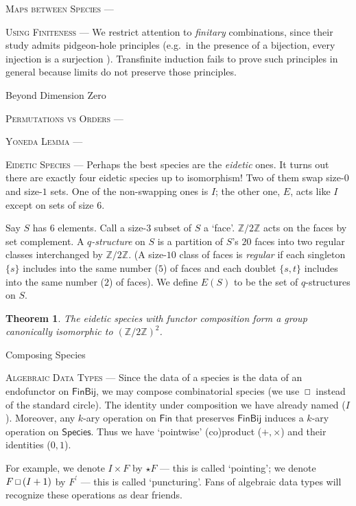 \documentclass[12pt, justified]{tufte-book}
\newcommand{\ZZ}{\mathbb{Z}}
\newcommand{\smallsquare}{\,\text{\scriptsize$\square$}\,}
\newtheorem*{thm}{Theorem}
\theoremstyle{definition}
\newcommand{\mssec}[1]{
  \begin{center}\parbox{8cm}{\begin{center}
    \large\sc#1
  \end{center}}\end{center}
      \vspace{-0.5cm}
}
\newcommand{\mpar}[1]{\vspace{0.5cm}\par\noindent\textsc{#1} --- }
\begin{document}
      \mpar{Maps between Species}

      \mpar{Using Finiteness}
        We restrict attention to \emph{finitary} combinations, since their
        study admits pidgeon-hole principles (e.g.\ in the presence of a
        bijection, every injection is a surjection%
        ).  Transfinite induction fails to prove such principles in general
        because limits do not preserve those principles.

    \mssec{Beyond Dimension Zero}
      \mpar{Permutations vs Orders}
      \mpar{Yoneda Lemma}
      \mpar{Eidetic Species}%
        Perhaps the best species are the \emph{eidetic} ones.
        It turns out there are exactly four
        eidetic species up to isomorphism!  
        Two of them swap size-$0$ and size-$1$ sets.
        One of the non-swapping ones is $I$;
        the other one, $E$, acts like $I$ except on sets of size $6$.

        Say $S$ has $6$ elements.  Call a size-$3$ subset of $S$ a `face'.
        $\ZZ/2\ZZ$ acts on the faces by set complement.
        A \emph{$q$-structure} on $S$ is a partition of $S$'s $20$ faces into
        two regular classes interchanged by $\ZZ/2\ZZ$.
        (A size-$10$ class of faces is \emph{regular} if each singleton $\{s\}$
        includes into the same number ($5$) of faces and each doublet $\{s,
        t\}$ includes into the same number ($2$) of faces).  We define $E(S)$
        to be the set of $q$-structures on $S$.

        \begin{thm}
          The eidetic species with functor composition form a group canonically
            isomorphic to $(\ZZ/2\ZZ)^2$.
        \end{thm}

    \mssec{Composing Species}
      \mpar{Algebraic Data Types}
        Since the data of a species is the data of an endofunctor on
        $\textsf{FinBij}$, we may compose combinatorial species (we use
        $\smallsquare$ instead of the standard circle).  The identity under
        composition we have already named ($I$).  Moreover, any $k$-ary
        operation on $\textsf{Fin}$ that preserves $\textsf{FinBij}$ induces a
        $k$-ary operation on $\textsf{Species}$.  Thus we have `pointwise'
        (co)product ($+, \times$) and their identities ($0, 1$).

        For example, 
        we denote $I\times F$ by $\star F$ --- this is called `pointing';
        we denote $F\smallsquare (I+1)$ by $F^\prime$ --- this is called `puncturing'.
        Fans of algebraic data types will recognize these operations as dear
        friends.
\end{document}
